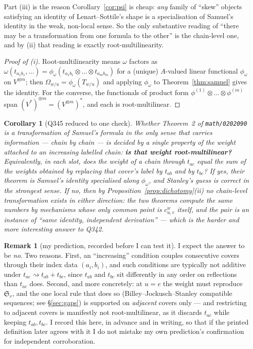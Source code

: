 \documentclass[11pt]{article}
\theoremstyle{plain}
\newtheorem{corollary}[theorem]{Corollary}
\theoremstyle{definition}
\newtheorem{remark}[theorem]{Remark}
\newcommand{\Sch}{\mathfrak{S}}
\begin{document}
\noindent Part (iii) is the reason Corollary~\ref{cor:psi} is cheap: \emph{any}
family of ``skew'' objects satisfying an identity of Lenart--Sottile's shape is
a specialisation of Samuel's identity in the weak, non-local sense. So the only
substantive reading of ``there may be a transformation from one formula to the
other'' is the chain-level one, and by (ii) that reading is exactly
root-multilinearity.

\begin{proof}[Proof of (i)]
Root-multilinearity means $\omega$ factors as
$\omega(t_{a_{1}b_{1}},\dots)=\phi_{\omega}(t_{a_{1}b_{1}}\otimes\dots\otimes t_{a_{m}b_{m}})$
for a (unique) $A$-valued linear functional $\phi_{\omega}$ on $V^{\otimes m}$;
then $\Omega_{w/u}=\phi_{\omega}(T_{w/u})$ and applying $\phi_{\omega}$ to
Theorem~\ref{thm:samuel} gives the identity. For the converse, the functionals
of product form $\phi^{(1)}\otimes\dots\otimes\phi^{(m)}$ span
$(V^{*})^{\otimes m}=(V^{\otimes m})^{*}$, and each is root-multilinear.
\end{proof}

\begin{corollary}[Q345 reduced to one check]\label{cor:q345}
Whether Theorem~2 of \texttt{math/0202090} is a transformation of Samuel's
formula in the only sense that carries information --- chain by chain --- is
decided by a single property of the weight attached to an increasing labelled
chain: \textbf{is that weight root-multilinear?} Equivalently, in each slot,
does the weight of a chain through $t_{ac}$ equal the sum of the weights
obtained by replacing that cover's label by $t_{ab}$ and by $t_{bc}$? If yes,
their theorem is Samuel's identity specialised along $\phi_{\omega}$, and
Stanley's guess is correct in the strongest sense. If no, then by
Proposition~\ref{prop:dichotomy}(ii) no chain-level transformation exists in
either direction: the two theorems compute the same numbers by mechanisms whose
only common point is $c^{w}_{u,v}$ itself, and the pair is an instance of
``same identity, independent derivation'' --- which is the harder and more
interesting answer to Q342.
\end{corollary}

\begin{remark}[my prediction, recorded before I can test it]\label{rem:pred}
I expect the answer to be \emph{no}. Two reasons. First, an ``increasing''
condition couples consecutive covers through their index data $(a_{i},b_{i})$,
and such conditions are typically not additive under
$t_{ac}\rightsquigarrow t_{ab}+t_{bc}$, since $t_{ab}$ and $t_{bc}$ sit
differently in any order on reflections than $t_{ac}$ does. Second, and more
concretely: at $u=e$ the weight must reproduce $\Sch_{v}$, and the one local
rule that does so (Billey--Jockusch--Stanley compatible sequences; see
\S\ref{sec:gaps}) is supported on \emph{adjacent} covers only --- and
restricting to adjacent covers is manifestly not root-multilinear, as it
discards $t_{ac}$ while keeping $t_{ab},t_{bc}$.
I record this here, in advance and in writing, so that if the printed
definition later agrees with it I do not mistake my own prediction's
confirmation for independent corroboration.
\end{remark}
\end{document}
